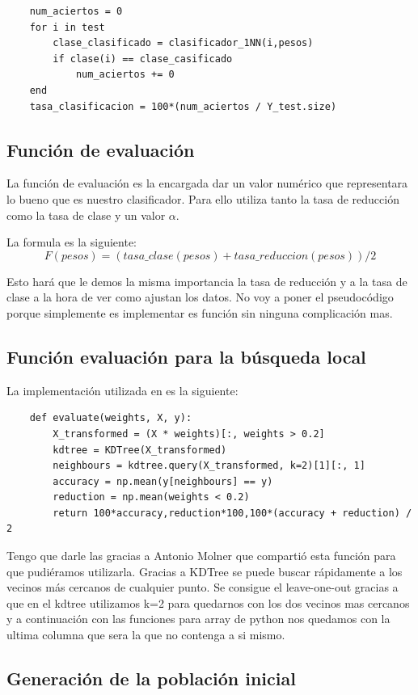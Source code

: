 \documentclass[titlepage]{article}
\begin{document}
	\begin{lstlisting}
	num_aciertos = 0
	for i in test
		clase_clasificado = clasificador_1NN(i,pesos)
		if clase(i) == clase_casificado
			num_aciertos += 0
	end
	tasa_clasificacion = 100*(num_aciertos / Y_test.size)
	\end{lstlisting}
	
	\subsection{Función de evaluación}
	La función de evaluación es la encargada dar un valor numérico que representara lo bueno que es nuestro clasificador. Para ello utiliza tanto la tasa de reducción como la tasa de clase y un valor $\alpha$. 
	
	La formula es la siguiente:
	$$
	F(pesos) = (tasa\_clase(pesos) + tasa\_reduccion(pesos)) / 2
	$$ 
	
	 Esto hará que le demos la misma importancia la tasa de reducción y a la tasa de clase a la hora de ver como ajustan los datos. No voy a poner el pseudocódigo porque simplemente es implementar es función sin ninguna complicación mas.
	

	\subsection{Función evaluación para la búsqueda local}
		La implementación utilizada en es la siguiente:
	
	\begin{lstlisting}
	def evaluate(weights, X, y):
		X_transformed = (X * weights)[:, weights > 0.2]
		kdtree = KDTree(X_transformed)
		neighbours = kdtree.query(X_transformed, k=2)[1][:, 1]
		accuracy = np.mean(y[neighbours] == y)
		reduction = np.mean(weights < 0.2)
		return 100*accuracy,reduction*100,100*(accuracy + reduction) / 2
	\end{lstlisting}
	
	Tengo que darle las gracias a Antonio Molner que compartió esta función para que pudiéramos utilizarla. Gracias a KDTree se puede buscar rápidamente a los vecinos más cercanos de cualquier punto.
	Se consigue el leave-one-out gracias a que en el kdtree utilizamos k=2 para quedarnos con los dos vecinos mas cercanos y a continuación con las funciones para array de python nos quedamos con la ultima columna que sera la que no contenga a si mismo.
	\subsection{Generación de la población inicial}
	
\end{document}
